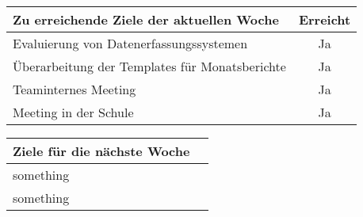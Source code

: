 \begin{tabularx}{\textwidth}{Xc}
    \arrayrulecolor{OliveGreen}
    \toprule
    {\bfseries Zu erreichende Ziele der aktuellen Woche} & {\bfseries Erreicht} \\
    \midrule[2pt]
    Evaluierung von Datenerfassungssystemen              &Ja                    \\
    \rowcolor{OliveGreen!15}
    Überarbeitung der Templates für Monatsberichte       &Ja                    \\
    \rowcolor{White}
    Teaminternes Meeting                                 &Ja                    \\
    \rowcolor{OliveGreen!15}
    Meeting in der Schule                                &Ja                    \\
    \bottomrule[2pt]
\end{tabularx}
%
\vspace{1cm}
%
\begin{tabularx}{\textwidth}{Xc}
    \arrayrulecolor{OliveGreen}
    \toprule
    {\bfseries Ziele für die nächste Woche}              &                      \\
    \midrule[2pt]
    something                                            &                      \\
    \rowcolor{OliveGreen!15}
    something                                            &                      \\
\end{tabularx}
